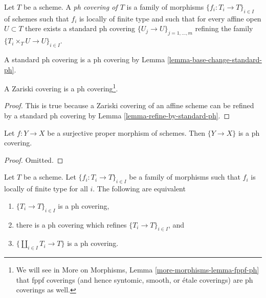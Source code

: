 \begin{definition}
\label{definition-ph-covering}
Let $T$ be a scheme. A {\it ph covering of $T$} is a family
of morphisms $\{f_i : T_i \to T\}_{i \in I}$ of schemes such
that $f_i$ is locally of finite type and such that for every
affine open $U \subset T$ there exists a standard ph covering
$\{U_j \to U\}_{j = 1, \ldots, m}$ refining the family
$\{T_i \times_T U \to U\}_{i \in I}$.
\end{definition}

\noindent
A standard ph covering is a ph covering by
Lemma \ref{lemma-base-change-standard-ph}.

\begin{lemma}
\label{lemma-zariski-ph}
A Zariski covering is a ph covering\footnote{We will see
in More on Morphisms, Lemma \ref{more-morphisms-lemma-fppf-ph} that
fppf coverings (and hence syntomic, smooth, or \'etale coverings)
are ph coverings as well.}.
\end{lemma}

\begin{proof}
This is true because a Zariski covering of an affine scheme
can be refined by a standard ph covering by
Lemma \ref{lemma-refine-by-standard-ph}.
\end{proof}

\begin{lemma}
\label{lemma-surjective-proper-ph}
Let $f : Y \to X$ be a surjective proper morphism of schemes.
Then $\{Y \to X\}$ is a ph covering.
\end{lemma}

\begin{proof}
Omitted.
\end{proof}

\begin{lemma}
\label{lemma-refine-by-ph}
Let $T$ be a scheme. Let $\{f_i : T_i \to T\}_{i \in I}$ be a family
of morphisms such that $f_i$ is locally of finite type for all $i$.
The following are equivalent
\begin{enumerate}
\item $\{T_i \to T\}_{i \in I}$ is a ph covering,
\item there is a ph covering which refines $\{T_i \to T\}_{i \in I}$, and
\item $\{\coprod_{i \in I} T_i \to T\}$ is a ph covering.
\end{enumerate}
\end{lemma}


